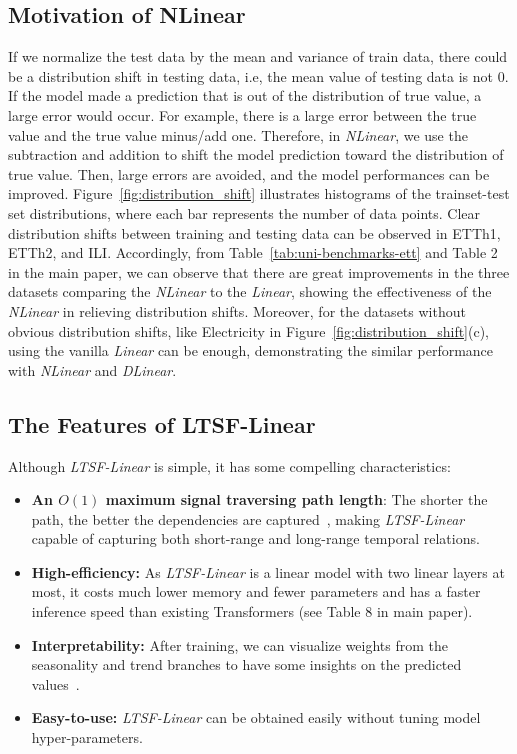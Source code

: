 \documentclass[10pt,twocolumn,letterpaper]{article}
\newcommand{\modelname}{\emph{LTSF-Linear}\xspace}
\begin{document}
\subsection{Motivation of NLinear}
If we normalize the test data by the mean and variance of train data, there could be a distribution shift in testing data, i.e, the mean value of testing data is not 0. If the model made a prediction that is out of the distribution of true value, a large error would occur. For example, there is a large error between the true value and the true value minus/add one. Therefore, in \emph{NLinear}, we use the subtraction and addition to shift the model prediction toward the distribution of true value. Then, large errors are avoided, and the model performances can be improved.
Figure~\ref{fig:distribution_shift} illustrates histograms of the trainset-test set distributions, where each bar represents the number of data points. Clear distribution shifts between training and testing data can be observed in ETTh1, ETTh2, and ILI. Accordingly, from Table~\ref{tab:uni-benchmarks-ett} and Table 2 in the main paper, we can observe that there are great improvements in the three datasets comparing the \emph{NLinear} to the \emph{Linear}, showing the effectiveness of the \emph{NLinear} in relieving distribution shifts. Moreover, for the datasets without obvious distribution shifts, like Electricity in Figure~\ref{fig:distribution_shift}(c), using the vanilla \emph{Linear} can be enough, demonstrating the similar performance with \emph{NLinear} and \emph{DLinear}.






\subsection{The Features of LTSF-Linear}


Although \modelname is simple, it has some compelling characteristics:

\begin{itemize}
\item \textbf{An $O(1)$ maximum signal traversing path length}: The shorter the path, the better the dependencies are captured~\cite{liu2021pyraformer}, making \modelname capable of capturing both short-range and long-range temporal relations.


\item \textbf{High-efficiency:} As \modelname is a linear model with two linear layers at most, it costs much lower memory and fewer parameters and has a faster inference speed than existing Transformers (see Table $8$ in main paper). 



\item \textbf{Interpretability:} After training, we can visualize weights from the seasonality and trend branches to have some insights on the predicted values~\cite{dong2008granular}. 


\item \textbf{Easy-to-use:} \modelname can be obtained easily without tuning model hyper-parameters.


\end{itemize}
\end{document}
